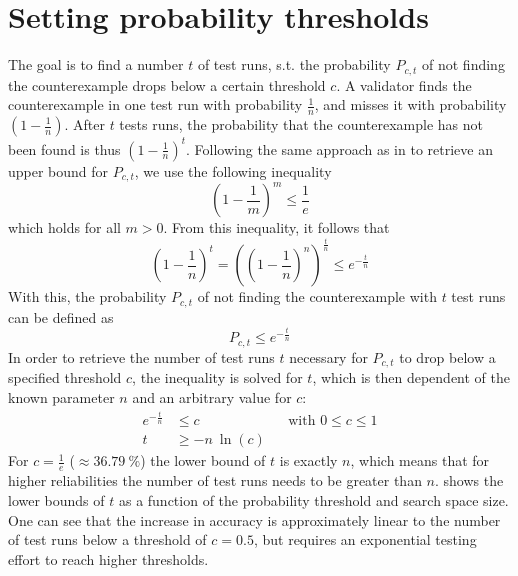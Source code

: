 \section{Setting probability thresholds}\label{sec:prob_threshold}
The goal is to find a number $t$ of test runs, s.t. the probability $P_{c,t}$ of not finding the counterexample drops below a certain threshold $c$. A validator finds the counterexample in one test run with probability $\frac{1}{n}$, and misses it with probability $(1-\frac{1}{n})$. After $t$ tests runs, the probability that the counterexample has not been found is thus $(1-\frac{1}{n})^t$. Following the same approach as in \cite{mahl_schindel_2007} to retrieve an upper bound for $P_{c,t}$, we use the following inequality
\begin{equation}
(1-\frac{1}{m})^m \leq \frac{1}{e}
\end{equation}
which holds for all $m > 0$. From this inequality, it follows that
\begin{equation}
(1-\frac{1}{n})^t = ((1-\frac{1}{n})^n)^{\frac{t}{n}} \le e^{-\frac{t}{n}}
\end{equation}
With this, the probability $P_{c,t}$ of not finding the counterexample with $t$ test runs can be defined as
\begin{equation}
P_{c,t} \le e^{-\frac{t}{n}}
\end{equation}
In order to retrieve the number of test runs $t$ necessary for $P_{c,t}$ to drop below a specified threshold $c$, the inequality is solved for $t$, which is then dependent of the known parameter $n$ and an arbitrary value for $c$:
\begin{align}
    e^{-\frac{t}{n}} &\leq c && \text{with } 0 \leq c\le 1 \nonumber\\
    t &\geq -n\:\ln(c)
\end{align}
For $c = \frac{1}{e}$ ($\approx 36.79\:\%$) the lower bound of $t$ is exactly $n$, which means that for higher reliabilities the number of test runs needs to be greater than $n$.  shows the lower bounds of $t$ as a function of the probability threshold and search space size. One can see that the increase in accuracy is approximately linear to the number of test runs below a threshold of $c=0.5$, but requires an exponential testing effort to reach higher thresholds.

